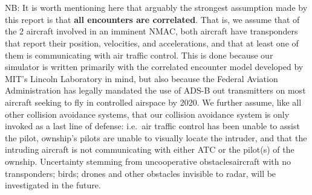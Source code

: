 \documentclass[journal, a4paper]{IEEEtran}
\begin{document}
\\\\NB: It is worth mentioning here that arguably the strongest assumption made by this report is that \textbf{all encounters are correlated}. That is, we assume that of the 2 aircraft involved in an imminent NMAC, both aircraft have transponders that report their position, velocities, and accelerations, and that at least one of them is communicating with air traffic control. This is done because our simulator is written primarily with the correlated encounter model developed by MIT's Lincoln Laboratory in mind, but also because the Federal Aviation Administration has legally mandated the use of ADS-B out transmitters on most aircraft seeking to fly in controlled airspace by 2020. We further assume, like all other collision avoidance systems, that our collision avoidance system is only invoked as a last line of defense: i.e.\ air traffic control has been unable to assist the pilot, ownship's pilots are unable to visually locate the intruder, and that the intruding aircraft is not communicating with either ATC or the pilot(s) of the ownship. Uncertainty stemming from uncooperative obstacles\textemdash aircraft with no transponders; birds; drones and other obstacles invisible to radar, will be investigated in the future.
    
\end{document}
